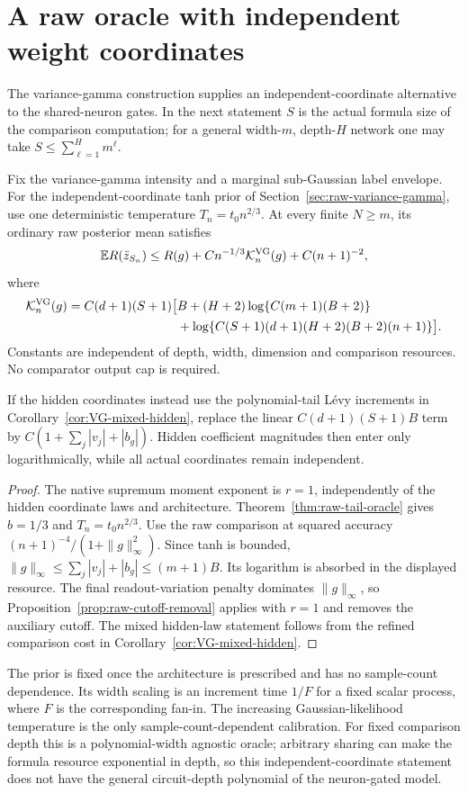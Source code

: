 \section{A raw oracle with independent weight coordinates}
\label{sec:VG-raw-oracle}
The variance-gamma construction supplies an independent-coordinate
alternative to the shared-neuron gates. In the next statement $S$ is
the actual formula size of the comparison computation; for a general
width-$m$, depth-$H$ network one may take
$S\le\sum_{\ell=1}^Hm^\ell$.

\begin{corollary}
\label{cor:VG-raw-oracle}
Fix the variance-gamma intensity and a marginal sub-Gaussian label
envelope. For the independent-coordinate tanh prior of
Section~\ref{sec:raw-variance-gamma}, use one deterministic temperature
$T_n=t_0n^{2/3}$. At every finite $N\ge m$, its ordinary raw posterior
mean satisfies
\[
 \mathbb E R(\bar z_{S_n})\le R(g)+C n^{-1/3}\mathcal K_n^{\rm VG}(g)
                                +C(n+1)^{-2},
\]
where
\begin{align*}
 \mathcal K_n^{\rm VG}(g)=C(d+1)(S+1)\big[&B+
       (H+2)\log\{C(m+1)(B+2)\}\\
       &+\log\{C(S+1)(d+1)(H+2)(B+2)(n+1)\}\big].
\end{align*}
Constants are independent of depth, width, dimension and comparison
resources. No comparator output cap is required.

If the hidden coordinates instead use the polynomial-tail L\'evy
increments in Corollary~\ref{cor:VG-mixed-hidden}, replace the linear
$C(d+1)(S+1)B$ term by
$C(1+\sum_j|v_j|+|b_g|)$. Hidden coefficient magnitudes then enter
only logarithmically, while all actual coordinates remain independent.
\end{corollary}
\begin{proof}
The native supremum moment exponent is $r=1$, independently of the
hidden coordinate laws and architecture. Theorem~\ref{thm:raw-tail-oracle}
gives $b=1/3$ and $T_n=t_0n^{2/3}$.
Use the raw comparison at squared accuracy
$(n+1)^{-4}/(1+\|g\|_\infty^2)$. Since tanh is bounded,
$\|g\|_\infty\le\sum_j|v_j|+|b_g|\le(m+1)B$.
Its logarithm is absorbed in the displayed resource. The final
readout-variation penalty dominates $\|g\|_\infty$, so
Proposition~\ref{prop:raw-cutoff-removal} applies with $r=1$ and
removes the auxiliary cutoff. The mixed hidden-law statement follows
from the refined comparison cost in
Corollary~\ref{cor:VG-mixed-hidden}.
\end{proof}

The prior is fixed once the architecture is prescribed and has no
sample-count dependence. Its width scaling is an increment time
$1/F$ for a fixed scalar process, where $F$ is the corresponding
fan-in. The increasing Gaussian-likelihood temperature is the only
sample-count-dependent calibration. For fixed comparison depth this
is a polynomial-width agnostic oracle; arbitrary sharing can make the
formula resource exponential in depth, so this independent-coordinate
statement does not have the general circuit-depth polynomial of the
neuron-gated model.
